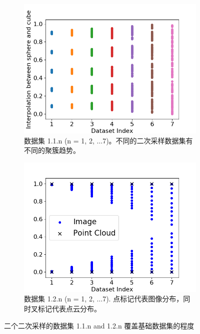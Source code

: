 \documentclass[bachelor, nocolorlinks, printoneside]{seuthesis} %
\begin{document}
\begin{Main}
\begin{figure}
	\begin{subfigure}[t]{0.45\linewidth} \centering 
     \includegraphics[width=\columnwidth]{figs/five-clusters.png}
     \caption{\small 数据集 1.1.n (n = 1, 2, $\ldots $7)。不同的二次采样数据集有不同的聚簇趋势。}\label{fig:five-clusters}
   \end{subfigure}\hspace{0.05\textwidth}
   \begin{subfigure}[t]{0.45\linewidth} \centering
     \includegraphics[width=\columnwidth]{figs/two-clusters.png}
     \caption{\small 数据集 1.2.n (n = 1, 2, $\ldots $7). 点标记代表图像分布，同时叉标记代表点云分布。}\label{fig:two-clusters}
   \end{subfigure}
   \caption{\small 二个二次采样的数据集 1.1.n and 1.2.n 覆盖基础数据集的程度}
\end{figure}


\end{Main}
\end{document}
